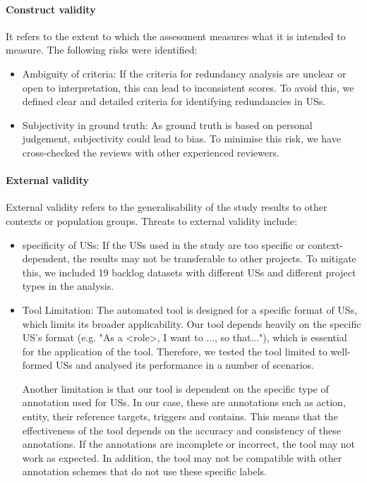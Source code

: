 \paragraph{Construct validity}It refers to the extent to which the assessment measures what it is intended to measure. The following risks were identified:
\begin{itemize}
	\item Ambiguity of criteria: If the criteria for redundancy analysis are unclear or open to interpretation, this can lead to inconsistent scores. To avoid this, we defined clear and detailed criteria for identifying redundancies in USs.
	
	\item Subjectivity in ground truth: As ground truth is based on personal judgement, subjectivity could lead to bias. To minimise this risk, we have cross-checked the reviews with other experienced reviewers.
\end{itemize}
\paragraph{External validity}External validity refers to the generalisability of the study results to other contexts or population groups. Threats to external validity include:

\begin{itemize}
	\item specificity of USs: If the USs used in the study are too specific or context-dependent, the results may not be transferable to other projects. To mitigate this, we included 19 backlog datasets with different USs and different project types in the analysis.
	
	\item Tool Limitation: The automated tool is designed for a specific format of USs, which limits its broader applicability. Our tool depends heavily on the specific US's format (e.g. "As a \textless role\textgreater, I want to ..., so that..."), which is essential for the application of the tool. Therefore, we tested the tool limited to well-formed USs and analysed its performance in a number of scenarios.
	
	Another limitation is that our tool is dependent on the specific type of annotation used for USs. In our case, these are annotations such as action, entity, their reference targets, triggers and contains. This means that the effectiveness of the tool depends on the accuracy and consistency of these annotations. If the annotations are incomplete or incorrect, the tool may not work as expected. In addition, the tool may not be compatible with other annotation schemes that do not use these specific labels.
\end{itemize}
